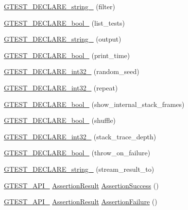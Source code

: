 \begin{DoxyCompactItemize}
\mbox{\hyperlink{namespacetesting_a20d69860ce843142c7f740262e6b0c9a}{G\+T\+E\+S\+T\+\_\+\+D\+E\+C\+L\+A\+R\+E\+\_\+string\+\_\+}} (filter)
\item 
\mbox{\hyperlink{namespacetesting_af2cd3595c571ca408afc337bc4bb2619}{G\+T\+E\+S\+T\+\_\+\+D\+E\+C\+L\+A\+R\+E\+\_\+bool\+\_\+}} (list\+\_\+tests)
\item 
\mbox{\hyperlink{namespacetesting_a3fe54dd551f1c36cfdd1b36cd6881a44}{G\+T\+E\+S\+T\+\_\+\+D\+E\+C\+L\+A\+R\+E\+\_\+string\+\_\+}} (output)
\item 
\mbox{\hyperlink{namespacetesting_aeccefd463a0942da24750e1bbee76041}{G\+T\+E\+S\+T\+\_\+\+D\+E\+C\+L\+A\+R\+E\+\_\+bool\+\_\+}} (print\+\_\+time)
\item 
\mbox{\hyperlink{namespacetesting_ae754999b59509808254d39e3a3cf38e0}{G\+T\+E\+S\+T\+\_\+\+D\+E\+C\+L\+A\+R\+E\+\_\+int32\+\_\+}} (random\+\_\+seed)
\item 
\mbox{\hyperlink{namespacetesting_a315ef0647e4f2795bf1705de8e9c9659}{G\+T\+E\+S\+T\+\_\+\+D\+E\+C\+L\+A\+R\+E\+\_\+int32\+\_\+}} (repeat)
\item 
\mbox{\hyperlink{namespacetesting_af37b9206b938bb8b7d398a1379eb7482}{G\+T\+E\+S\+T\+\_\+\+D\+E\+C\+L\+A\+R\+E\+\_\+bool\+\_\+}} (show\+\_\+internal\+\_\+stack\+\_\+frames)
\item 
\mbox{\hyperlink{namespacetesting_a6d87f7374e105483905a305328856f4b}{G\+T\+E\+S\+T\+\_\+\+D\+E\+C\+L\+A\+R\+E\+\_\+bool\+\_\+}} (shuffle)
\item 
\mbox{\hyperlink{namespacetesting_adba6f8afa0f8695956d0134f1629a10b}{G\+T\+E\+S\+T\+\_\+\+D\+E\+C\+L\+A\+R\+E\+\_\+int32\+\_\+}} (stack\+\_\+trace\+\_\+depth)
\item 
\mbox{\hyperlink{namespacetesting_ac69f2aeeb84dc5f49bd3d040a6f32d17}{G\+T\+E\+S\+T\+\_\+\+D\+E\+C\+L\+A\+R\+E\+\_\+bool\+\_\+}} (throw\+\_\+on\+\_\+failure)
\item 
\mbox{\hyperlink{namespacetesting_ad4d1ea63037fc21018dbe997cb0041d1}{G\+T\+E\+S\+T\+\_\+\+D\+E\+C\+L\+A\+R\+E\+\_\+string\+\_\+}} (stream\+\_\+result\+\_\+to)
\item 
\mbox{\hyperlink{gtest-port_8h_aa73be6f0ba4a7456180a94904ce17790}{G\+T\+E\+S\+T\+\_\+\+A\+P\+I\+\_\+}} \mbox{\hyperlink{classtesting_1_1_assertion_result}{Assertion\+Result}} \mbox{\hyperlink{namespacetesting_a74a3d26c1286bd4d7c189c5dff2483ab}{Assertion\+Success}} ()
\item 
\mbox{\hyperlink{gtest-port_8h_aa73be6f0ba4a7456180a94904ce17790}{G\+T\+E\+S\+T\+\_\+\+A\+P\+I\+\_\+}} \mbox{\hyperlink{classtesting_1_1_assertion_result}{Assertion\+Result}} \mbox{\hyperlink{namespacetesting_a8d91083190a5914bfe8c5666e2dbca9b}{Assertion\+Failure}} ()

\end{DoxyCompactItemize}
